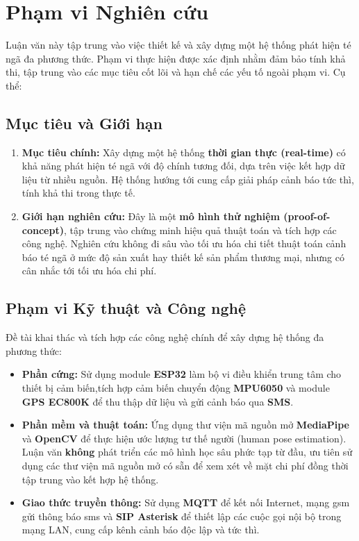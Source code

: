 
\section{Phạm vi Nghiên cứu}

Luận văn này tập trung vào việc thiết kế và xây dựng một hệ thống phát hiện té ngã đa phương thức. Phạm vi thực hiện được xác định nhằm đảm bảo tính khả thi, tập trung vào các mục tiêu cốt lõi và hạn chế các yếu tố ngoài phạm vi. Cụ thể:

\subsection{Mục tiêu và Giới hạn}
\begin{enumerate}
    \item \textbf{Mục tiêu chính:} Xây dựng một hệ thống \textbf{thời gian thực (real-time)} có khả năng phát hiện té ngã với độ chính tương đối, dựa trên việc kết hợp dữ liệu từ nhiều nguồn. Hệ thống hướng tới cung cấp giải pháp cảnh báo tức thì, tính khả thi trong thực tế.
    
    \item \textbf{Giới hạn nghiên cứu:} Đây là một \textbf{mô hình thử nghiệm (proof-of-concept)}, tập trung vào chứng minh hiệu quả thuật toán và tích hợp các công nghệ. Nghiên cứu không đi sâu vào tối ưu hóa chi tiết thuật toán cảnh báo té ngã ở mức độ sản xuất hay thiết kế sản phẩm thương mại, nhưng có cân nhắc tới tối ưu hóa chi phí.
\end{enumerate}

\subsection{Phạm vi Kỹ thuật và Công nghệ}
Đề tài khai thác và tích hợp các công nghệ chính để xây dựng hệ thống đa phương thức:
\begin{itemize}
    \item \textbf{Phần cứng:} Sử dụng module \textbf{ESP32} làm bộ vi điều khiển trung tâm cho thiết bị cảm biến,tích hợp cảm biến chuyển động \textbf{MPU6050} và module \textbf{GPS EC800K} để thu thập dữ liệu và gửi cảnh báo qua \textbf{SMS}.
    
    \item \textbf{Phần mềm và thuật toán:} Ứng dụng thư viện mã nguồn mở \textbf{MediaPipe} và \textbf{OpenCV} để thực hiện ước lượng tư thế người (human pose estimation). Luận văn \textbf{không} phát triển các mô hình học sâu phức tạp từ đầu, ưu tiên sử dụng các thư viện mã nguồn mở có sẵn để xem xét về mặt chi phí đồng thời tập trung vào kết hợp hệ thống.
    
    \item \textbf{Giao thức truyền thông:} Sử dụng \textbf{MQTT} để kết nối Internet, mạng gsm gửi thông báo sms và \textbf{SIP Asterisk} để thiết lập các cuộc gọi nội bộ trong mạng LAN, cung cấp kênh cảnh báo độc lập và tức thì.
\end{itemize}


